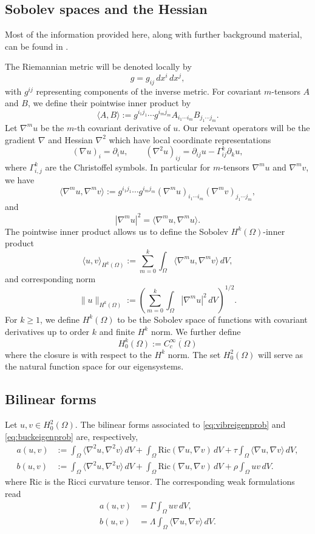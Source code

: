 \documentclass[11pt]{amsart}
\theoremstyle{definition}
\numberwithin{equation}{section}
\newcommand{\grad}{\nabla}
\begin{document}
\subsection*{Sobolev spaces and the Hessian}

Most of the information provided here, along with further background material, can be found in \cite{H96}.

The Riemannian metric will be denoted locally by
\[
g=g_{ij}\,dx^i\,dx^j,
\]
with $g^{ij}$ representing components of the inverse metric.
For covariant $m$-tensors $A$ and $B$, we define their pointwise inner product by
\[
\langle A,B\rangle
:=
g^{i_1j_1}\cdots g^{i_mj_m}
A_{i_1\cdots i_m}B_{j_1\cdots j_m}.
\]
Let $\nabla^m u$ be the $m$-th covariant derivative of $u$. Our relevant operators will be the gradient $\grad$ and Hessian $\grad^2$ which have local coordinate representations
\[
(\nabla u)_i=\partial_i u,
\qquad
(\nabla^2 u)_{ij}=\partial_{ij}u-\Gamma_{ij}^k\partial_k u,
\]
where $\Gamma_{i,j}^k$ are the Christoffel symbols.
In particular for $m$-tensors $\grad^m u$ and $\grad^m v$, we have
\[
\langle \nabla^m u,\nabla^m v\rangle
:=
g^{i_1j_1}\cdots g^{i_mj_m}
(\nabla^m u)_{i_1\cdots i_m}(\nabla^m v)_{j_1\cdots j_m},
\]
and
\[
|\nabla^m u|^2=\langle \nabla^m u,\nabla^m u\rangle.
\]
The pointwise inner product allows us to define the Sobolev $H^k(\Omega)$-inner product
\[
\langle u,v\rangle_{H^k(\Omega)}
:=
\sum_{m=0}^k \int_\Omega \langle \nabla^m u,\nabla^m v\rangle\,dV,
\]
and corresponding norm
\[
\|u\|_{H^k(\Omega)}
:=
\left(\sum_{m=0}^k \int_\Omega |\nabla^m u|^2\,dV\right)^{1/2}.
\]
For $k \geq 1$, we define $H^k(\Omega)$
to be the Sobolev space of functions with covariant derivatives up to order $k$ and finite $H^k$ norm. We further define
\[
H_0^k(\Omega)
:=
\overline{C_c^\infty(\Omega)}
\]
where the closure is with respect to the $H^k$ norm.
The set $H_0^2(\Omega)$ will serve as the natural function space for our eigensystems.

\subsection*{Bilinear forms}

Let $u,v \in H_0^2(\Omega)$. The bilinear forms associated to \eqref{eq:vibreigenprob} and \eqref{eq:buckeigenprob} are, respectively,
\begin{align*}
a(u,v)
&:= \int_{\Omega} \langle \nabla^2 u,\nabla^2 v\rangle \, dV
   + \int_{\Omega} \mathrm{Ric}(\nabla u,\nabla v)\, dV
   + \tau\int_{\Omega} \langle \nabla u,\nabla v\rangle \, dV,
\\
b(u,v)
&:= \int_{\Omega} \langle \nabla^2 u,\nabla^2 v\rangle \, dV
   + \int_{\Omega} \mathrm{Ric}(\nabla u,\nabla v)\, dV
   + \rho\int_{\Omega} u v \, dV.
\end{align*}
where $\text{Ric}$ is the Ricci curvature tensor.
The corresponding weak formulations read
\begin{align*}
a(u,v) &= \Gamma\int_{\Omega} u v \, dV,
\\
b(u,v) &= \Lambda\int_{\Omega} \langle \nabla u,\nabla v\rangle \, dV.
\end{align*}
\end{document}
